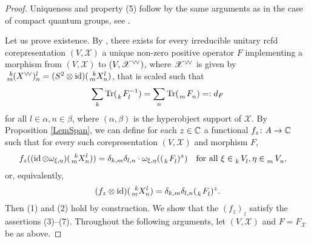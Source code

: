 \begin{proof}
Uniqueness and property (5) follow by the same arguments as in the case of compact quantum groups, see \cite[Theorem 5.6]{W1}.

  Let us prove existence.  By   \cite[Theorem 2.21]{DCT1}, there exists 
for every irreducible unitary rcfd corepresentation  $(V,\mathscr{X})$
a unique non-zero positive operator $F$ implementing a morphism from $(V,\mathscr{X})$ to   $(V, \mathscr{X}^{\vee}\!{}^{\vee})$, where
 $\mathscr{X}^{\vee}\!{}^{\vee}$ is given by  $\Gr{(\dual{\dual{X}{}\!})}{k}{l}{m}{n} = (S^{2}\otimes \id)(\Gr{X}{k}{l}{m}{n})$, that is scaled such that
    \begin{align*}
       \sum_{k} \Tr(\Gr{F}{}{-1}{k}{l}) = \sum_{n}
      \Tr(\Grd{F}{m}{n}) =:d_{F}
    \end{align*}
    for all $l \in \alpha,n\in \beta$, where $(\alpha,\beta)$ is the hyperobject support of $\mathscr{X}$. 
By Proposition \ref{LemSpan}, we can   define for each $z\in \mathbb{C}$ a functional $f_{z} \colon A \to \mathbb{C}$ such  that for every such corepresentation  $(V,\mathscr{X})$ and morphism $F$,
    \begin{align*}
      f_{z}((\id \otimes \omega_{\xi,\eta})(\Gr{X}{k}{l}{m}{n})) &=
      \delta_{k,m}\delta_{l,n} \cdot
      \omega_{\xi,\eta}((\Grd{F}{k}{l})^{z}) \quad \text{for all }
      \xi \in \Gru{V}{k}{l},\eta \in
      \Gru{V}{m}{n},
    \end{align*}
    or, equivalently,
    \begin{align*}
      (f_{z} \otimes \id)(\Gr{X}{k}{l}{m}{n}) =
      \delta_{k,m}\delta_{l,n} (\Grd{F}{k}{l})^{z}.
    \end{align*}
    Then (1) and (2) hold by construction. We show that the
    $(f_{z})_{z}$ satisfy the assertions (3)--(7).
    Throughout the following arguments, let    $(V,\mathscr{X})$ and $F=F_{\mathscr{X}}$ be as above.


\end{proof}
